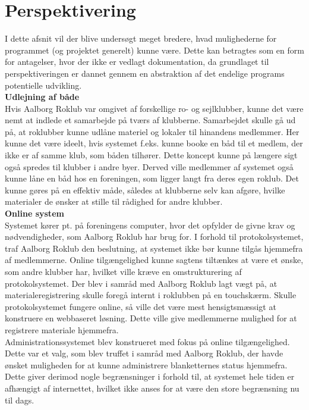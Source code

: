 \chapter{Perspektivering}
\label{sec:Perspektivering}
I dette afsnit vil der blive undersøgt meget bredere, hvad mulighederne for programmet (og projektet generelt) kunne være. Dette kan betragtes som en form for antagelser, hvor der ikke er vedlagt dokumentation, da grundlaget til perspektiveringen er dannet gennem en abstraktion af det endelige programs potentielle udvikling. \\

\textbf{Udlejning af både}\\
Hvis Aalborg Roklub var omgivet af forskellige ro- og sejlklubber, kunne det være nemt at indlede et samarbejde på tværs af klubberne. Samarbejdet skulle gå ud på, at roklubber kunne udlåne materiel og lokaler til hinandens medlemmer. Her kunne det være ideelt, hvis systemet f.eks. kunne booke en båd til et medlem, der ikke er af samme klub, som båden tilhører. Dette koncept kunne på længere sigt også spredes til klubber i andre byer. Derved ville medlemmer af systemet også kunne låne en båd hos en foreningen, som ligger langt fra deres egen roklub. Det kunne gøres på en effektiv måde, således at klubberne selv kan afgøre, hvilke materialer de ønsker at stille til rådighed for andre klubber. \\

\textbf{Online system}\\
Systemet kører pt. på foreningens computer, hvor det opfylder de givne krav og nødvendigheder, som Aalborg Roklub har brug for. I forhold til protokolsystemet, traf Aalborg Roklub den beslutning, at systemet ikke bør kunne tilgås hjemmefra af medlemmerne. Online tilgængelighed kunne sagtens tiltænkes at være et ønske, som andre klubber har, hvilket ville kræve en omstrukturering af protokolsystemet. Der blev i samråd med Aalborg Roklub lagt vægt på, at materialeregistrering skulle foregå internt i roklubben på en touchskærm. Skulle protokolsystemet fungere online, så ville det være mest hensigtsmæssigt at konstruere en webbaseret løsning. Dette ville give medlemmerne mulighed for at registrere materiale hjemmefra. \\

Administrationssystemet blev konstrueret med fokus på online tilgængelighed. Dette var et valg, som blev truffet i samråd med Aalborg Roklub, der havde ønsket muligheden for at kunne administrere blanketternes status hjemmefra. Dette giver derimod nogle begrænsninger i forhold til, at systemet hele tiden er afhængigt af internettet, hvilket ikke anses for at være den store begrænsning nu til dags. \\

